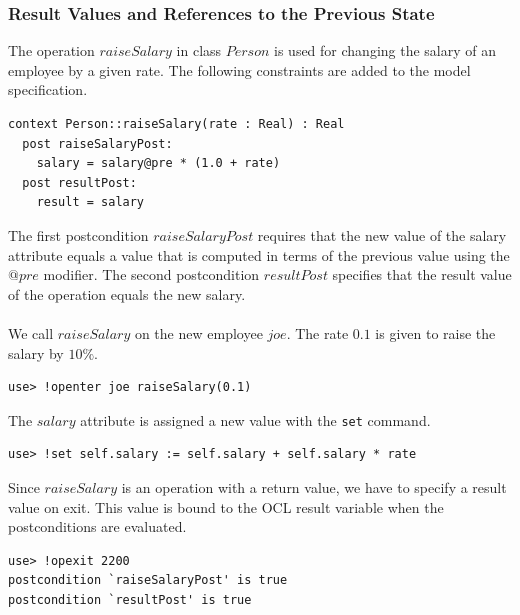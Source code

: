 \documentclass[a4paper,titlepage,oneside,final]{scrreprt} %
\begin{document}
\subsubsection{Result Values and References to the Previous State}
The operation $\mathit{raiseSalary}$ in class $\mathit{Person}$ is used for changing the
salary of an employee by a given rate.
The following constraints are added to the model specification.
\begin{verbatim}
context Person::raiseSalary(rate : Real) : Real
  post raiseSalaryPost:
    salary = salary@pre * (1.0 + rate)
  post resultPost:
    result = salary
\end{verbatim}
The first postcondition $\mathit{raiseSalaryPost}$ requires
that the new value of the salary attribute equals
a value that is computed in terms of the previous
value using the $\mathit{@pre}$ modifier. The second postcondition
$\mathit{resultPost}$ specifies that the result value of the operation
equals the new salary.\\\\
We call $\mathit{raiseSalary}$ on the new employee $\mathit{joe}$.
The rate $0.1$ is given to raise the salary by $10\%$.
\begin{verbatim}
use> !openter joe raiseSalary(0.1)
\end{verbatim}
The $\mathit{salary}$ attribute is assigned a new value with the \verb+set+ command.
\begin{verbatim}
use> !set self.salary := self.salary + self.salary * rate
\end{verbatim}
Since $\mathit{raiseSalary}$ is an operation with a return value,
we have to specify a result value on exit. This value
is bound to the OCL result variable when the postconditions are evaluated.
\begin{verbatim}
use> !opexit 2200
postcondition `raiseSalaryPost' is true
postcondition `resultPost' is true
\end{verbatim}
\end{document}

